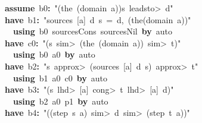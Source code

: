 \documentclass{article}
\newcommand{\syntaxKEYWORDA}[1]{\textcolor[rgb]{0.0,0.4,0.6}{\textbf{#1}}}
\newcommand{\syntaxKEYWORDC}[1]{\textcolor[rgb]{0.0,0.6,1.0}{\textbf{#1}}}
\newcommand{\syntaxLITERALA}[1]{\textcolor[rgb]{1.0,0.0,0.8}{#1}}
\newcommand{\syntaxOPERATOR}[1]{\textcolor[rgb]{0.0,0.0,0.0}{\textbf{#1}}}
\newcommand{\syntaxKEYWORDA}[1]{\textcolor[rgb]{0.0,0.4,0.6}{\textbf{#1}}}
\newcommand{\syntaxKEYWORDC}[1]{\textcolor[rgb]{0.0,0.6,1.0}{\textbf{#1}}}
\newcommand{\syntaxLITERALA}[1]{\textcolor[rgb]{1.0,0.0,0.8}{#1}}
\newcommand{\syntaxOPERATOR}[1]{\textcolor[rgb]{0.0,0.0,0.0}{\textbf{#1}}}
\newcommand{\syntaxKEYWORDA}[1]{\textcolor[rgb]{0.0,0.4,0.6}{\textbf{#1}}}
\newcommand{\syntaxKEYWORDC}[1]{\textcolor[rgb]{0.0,0.6,1.0}{\textbf{#1}}}
\newcommand{\syntaxLITERALA}[1]{\textcolor[rgb]{1.0,0.0,0.8}{#1}}
\newcommand{\syntaxOPERATOR}[1]{\textcolor[rgb]{0.0,0.0,0.0}{\textbf{#1}}}
\newcommand{\syntaxKEYWORDA}[1]{\textcolor[rgb]{0.0,0.4,0.6}{#1}}
\newcommand{\syntaxKEYWORDC}[1]{\textcolor[rgb]{0.0,0.6,1.0}{#1}}
\newcommand{\syntaxLITERALA}[1]{\textcolor[rgb]{1.0,0.0,0.8}{\textbf{#1}}}
\newcommand{\syntaxOPERATOR}[1]{\textcolor[rgb]{0.0,0.0,0.0}{#1}}
\newcommand{\syntaxKEYWORDA}[1]{\textcolor[rgb]{0.0,0.4,0.6}{\textbf{#1}}}
\newcommand{\syntaxKEYWORDC}[1]{\textcolor[rgb]{0.0,0.6,1.0}{\textbf{#1}}}
\newcommand{\syntaxLITERALA}[1]{\textcolor[rgb]{1.0,0.0,0.8}{#1}}
\newcommand{\syntaxOPERATOR}[1]{\textcolor[rgb]{0.0,0.0,0.0}{\textbf{#1}}}
\newcommand{\syntaxKEYWORDA}[1]{\textcolor[rgb]{0.0,0.4,0.6}{\textbf{#1}}}
\newcommand{\syntaxKEYWORDC}[1]{\textcolor[rgb]{0.0,0.6,1.0}{\textbf{#1}}}
\newcommand{\syntaxLITERALA}[1]{\textcolor[rgb]{1.0,0.0,0.8}{#1}}
\newcommand{\syntaxOPERATOR}[1]{\textcolor[rgb]{0.0,0.0,0.0}{\textbf{#1}}}
\begin{document}
{\ }{\ }{\ }{\ }{\ }{\ }{\ }{\ }{\ }{\ }{\ }{\ }{\ }{\ }\syntaxKEYWORDC{assume}{\ }b0\syntaxOPERATOR{:}{\ }\syntaxLITERALA{"(the{\ }(domain{\ }a))\usebox{\atbox}s{\ }\<leadsto>{\ }d"}\hspace*{\fill}\\
{\ }{\ }{\ }{\ }{\ }{\ }{\ }{\ }{\ }{\ }{\ }{\ }{\ }{\ }\syntaxKEYWORDA{have}{\ }b1\syntaxOPERATOR{:}{\ }\syntaxLITERALA{"sources{\ }{[}a{]}{\ }d{\ }s{\ }={\ }\usebox{\opencurlybracket}d,{\ }(the(domain{\ }a))\usebox{\closecurlybracket}"}\hspace*{\fill}\\
{\ }{\ }{\ }{\ }{\ }{\ }{\ }{\ }{\ }{\ }{\ }{\ }{\ }{\ }{\ }{\ }\syntaxKEYWORDA{using}{\ }b0{\ }sources\usebox{\underscorebox}Cons{\ }sources\usebox{\underscorebox}Nil{\ }\syntaxKEYWORDA{by}{\ }auto\hspace*{\fill}\\
{\ }{\ }{\ }{\ }{\ }{\ }{\ }{\ }{\ }{\ }{\ }{\ }{\ }{\ }\syntaxKEYWORDA{have}{\ }c0\syntaxOPERATOR{:}{\ }\syntaxLITERALA{"(s{\ }\<sim>{\ }(the{\ }(domain{\ }a)){\ }\<sim>{\ }t)"}\hspace*{\fill}\\
{\ }{\ }{\ }{\ }{\ }{\ }{\ }{\ }{\ }{\ }{\ }{\ }{\ }{\ }{\ }{\ }\syntaxKEYWORDA{using}{\ }b0{\ }a0{\ }\syntaxKEYWORDA{by}{\ }auto\hspace*{\fill}\\
{\ }{\ }{\ }{\ }{\ }{\ }{\ }{\ }{\ }{\ }{\ }{\ }{\ }{\ }\syntaxKEYWORDA{have}{\ }b2\syntaxOPERATOR{:}{\ }\syntaxLITERALA{"s{\ }\<approx>{\ }(sources{\ }{[}a{]}{\ }d{\ }s){\ }\<approx>{\ }t"}\hspace*{\fill}\\
{\ }{\ }{\ }{\ }{\ }{\ }{\ }{\ }{\ }{\ }{\ }{\ }{\ }{\ }{\ }{\ }\syntaxKEYWORDA{using}{\ }b1{\ }a0{\ }c0{\ }\syntaxKEYWORDA{by}{\ }auto\hspace*{\fill}\\
{\ }{\ }{\ }{\ }{\ }{\ }{\ }{\ }{\ }{\ }{\ }{\ }{\ }{\ }\syntaxKEYWORDA{have}{\ }b3\syntaxOPERATOR{:}{\ }\syntaxLITERALA{"(s{\ }\<lhd>{\ }{[}a{]}{\ }\<cong>{\ }t{\ }\<lhd>{\ }{[}a{]}{\ }\usebox{\atbox}{\ }d)"}\hspace*{\fill}\\
{\ }{\ }{\ }{\ }{\ }{\ }{\ }{\ }{\ }{\ }{\ }{\ }{\ }{\ }{\ }{\ }\syntaxKEYWORDA{using}{\ }b2{\ }a0{\ }p1{\ }\syntaxKEYWORDA{by}{\ }auto\hspace*{\fill}\\
{\ }{\ }{\ }{\ }{\ }{\ }{\ }{\ }{\ }{\ }{\ }{\ }{\ }{\ }\syntaxKEYWORDA{have}{\ }b4\syntaxOPERATOR{:}{\ }\syntaxLITERALA{"((step{\ }s{\ }a){\ }\<sim>{\ }d{\ }\<sim>{\ }(step{\ }t{\ }a))"}\hspace*{\fill}\\
\end{document}
